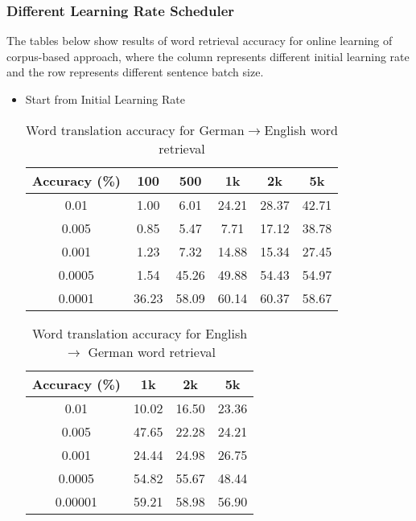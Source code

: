 \subsubsection{Different Learning Rate Scheduler}
The tables below show results of word retrieval accuracy for online learning of corpus-based approach, where the column represents different initial learning rate and the row represents different sentence batch size.
\begin{itemize}
	\item Start from Initial Learning Rate
		\begin{table}[h]
			\centering
		\caption{Word translation accuracy for German$\rightarrow$English word retrieval}
			\begin{tabular}{cccccc}
				\hline
				Accuracy (\%) & 100   & 500   & 1k    & 2k    & 5k    \\ \hline
				0.01          & 1.00  & 6.01  & 24.21 & 28.37 & 42.71 \\ \hline
				0.005         & 0.85  & 5.47  & 7.71  & 17.12 & 38.78 \\ \hline
				0.001         & 1.23  & 7.32  & 14.88 & 15.34 & 27.45 \\ \hline
				0.0005        & 1.54  & 45.26 & 49.88 & 54.43 & 54.97 \\ \hline
				0.0001        & 36.23 & 58.09 & 60.14 & 60.37 & 58.67 \\ \hline
			\end{tabular}

		\end{table}
		\begin{table}[h]
			\centering
		 \caption{Word translation accuracy for English $\rightarrow$ German word retrieval}
			\begin{tabular}{cccc}
				\hline
				Accuracy (\%) & 1k   & 2k   & 5k      \\ \hline
				0.01          & 10.02  & 16.50  & 23.36 \\ \hline
				0.005       & 47.65 & 22.28 & 24.21 \\ \hline
				0.001        & 24.44 & 24.98 & 26.75 \\ \hline
				0.0005          & 54.82  & 55.67  & 48.44 \\ \hline
				0.00001        & 59.21 & 58.98 & 56.90 \\ \hline
			\end{tabular}


\end{table}
\end{itemize}
